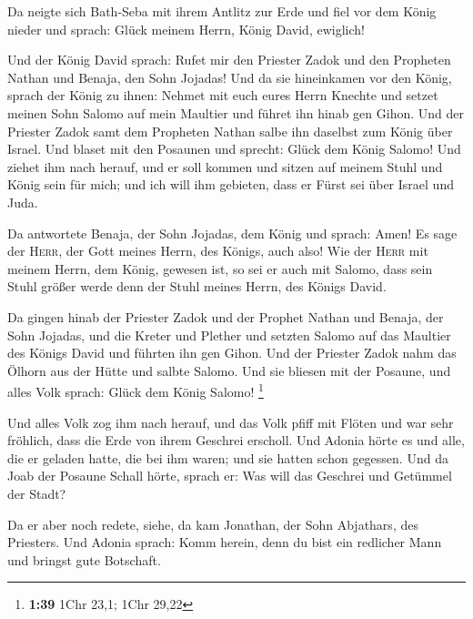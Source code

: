  Da neigte sich Bath-Seba mit ihrem Antlitz zur Erde und
fiel vor dem König nieder und sprach: Glück meinem Herrn, König David,
ewiglich!

 Und der König David sprach: Rufet mir den Priester Zadok
und den Propheten Nathan und Benaja, den Sohn Jojadas! Und da sie
hineinkamen vor den König,  sprach der König zu ihnen:
Nehmet mit euch eures Herrn Knechte und setzet meinen Sohn Salomo auf
mein Maultier und führet ihn hinab gen Gihon.  Und der
Priester Zadok samt dem Propheten Nathan salbe ihn daselbst zum König
über Israel. Und blaset mit den Posaunen und sprecht: Glück dem König
Salomo!  Und ziehet ihm nach herauf, und er soll kommen
und sitzen auf meinem Stuhl und König sein für mich; und ich will ihm
gebieten, dass er Fürst sei über Israel und Juda.

 Da antwortete Benaja, der Sohn Jojadas, dem König und
sprach: Amen! Es sage der \textsc{Herr}, der Gott meines Herrn, des
Königs, auch also!  Wie der \textsc{Herr} mit meinem
Herrn, dem König, gewesen ist, so sei er auch mit Salomo, dass sein
Stuhl größer werde denn der Stuhl meines Herrn, des Königs David.

 Da gingen hinab der Priester Zadok und der Prophet
Nathan und Benaja, der Sohn Jojadas, und die Kreter und Plether und
setzten Salomo auf das Maultier des Königs David und führten ihn gen
Gihon.  Und der Priester Zadok nahm das Ölhorn aus der
Hütte und salbte Salomo. Und sie bliesen mit der Posaune, und alles Volk
sprach: Glück dem König Salomo! \footnote{\textbf{1:39} 1Chr 23,1; 1Chr
  29,22}

 Und alles Volk zog ihm nach herauf, und das Volk pfiff
mit Flöten und war sehr fröhlich, dass die Erde von ihrem Geschrei
erscholl.  Und Adonia hörte es und alle, die er geladen
hatte, die bei ihm waren; und sie hatten schon gegessen. Und da Joab der
Posaune Schall hörte, sprach er: Was will das Geschrei und Getümmel der
Stadt?

 Da er aber noch redete, siehe, da kam Jonathan, der Sohn
Abjathars, des Priesters. Und Adonia sprach: Komm herein, denn du bist
ein redlicher Mann und bringst gute Botschaft.

